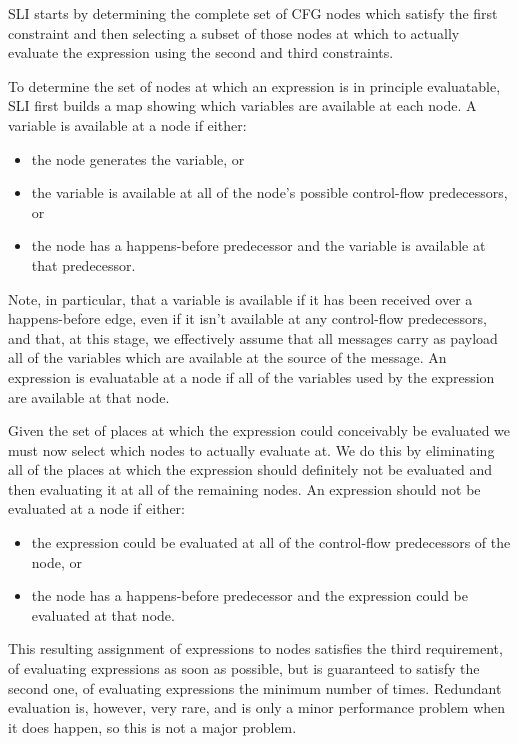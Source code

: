SLI starts by determining the complete set of CFG nodes which satisfy the first constraint and then selecting a subset of those nodes at which to actually evaluate the expression using the second and third constraints.

To determine the set of nodes at which an expression is in principle evaluatable, SLI first builds a map showing which variables are available at each node.
A variable is available at a node if either:

\begin{itemize}
\item
  the node generates the variable, or
\item
  the variable is available at all of the node's possible control-flow predecessors, or
\item
  the node has a happens-before predecessor and the variable is available at that predecessor.
\end{itemize}

Note, in particular, that a variable is available if it has been received over a happens-before edge, even if it isn't available at any control-flow predecessors, and that, at this stage, we effectively assume that all messages carry as payload all of the variables which are available at the source of the message.
An expression is evaluatable at a node if all of the variables used by the expression are available at that node.

Given the set of places at which the expression could conceivably be evaluated we must now select which nodes to actually evaluate at.
We do this by eliminating all of the places at which the expression should definitely not be evaluated and then evaluating it at all of the remaining nodes.
An expression should not be evaluated at a node if either:

\begin{itemize}
\item the expression could be evaluated at all of the control-flow predecessors of the node, or
\item the node has a happens-before predecessor and the expression could be evaluated at that node.
\end{itemize}

This resulting assignment of expressions to nodes satisfies the third requirement, of evaluating expressions as soon as possible, but is guaranteed to satisfy the second one, of evaluating expressions the minimum number of times.
Redundant evaluation is, however, very rare, and is only a minor performance problem when it does happen, so this is not a major problem.

